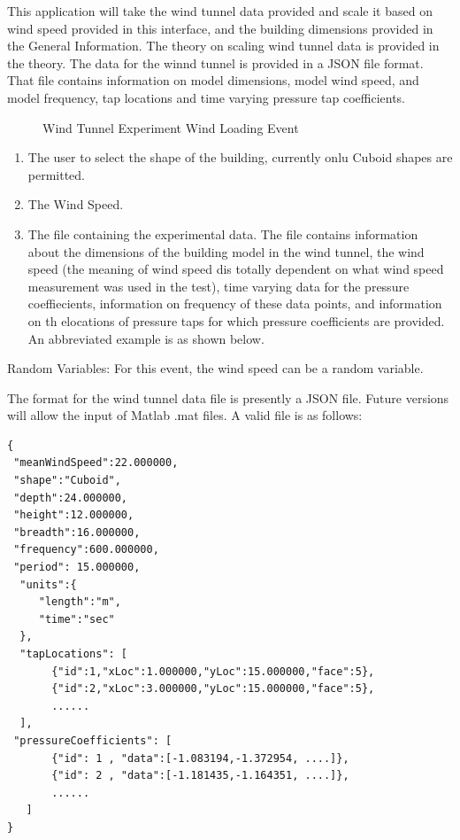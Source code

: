 This application will take the wind tunnel data provided and scale it based on wind speed provided in this interface, and the building dimensions provided in the General Information. The theory on scaling wind tunnel data is provided in the theory. The data for the winnd tunnel is provided in a JSON file format. That file contains information on model dimensions, model wind speed, and model frequency, tap locations and time varying pressure tap coefficients.

\begin{figure}[!htbp]
  \caption{Wind Tunnel Experiment  Wind Loading Event}
  \label{fig:dedm_hrp}
\end{figure}

\begin{enumerate} 
\item The user to select the shape of the building, currently onlu Cuboid shapes are permitted.
\item The Wind Speed.
\item The file containing the experimental data. The file contains information about the dimensions of the building model in the wind tunnel, the wind speed (the meaning of wind speed dis totally dependent on what wind speed measurement was used in the test), time varying data for the pressure coeffiecients, information on frequency of these data points, and information on th elocations of pressure taps for which pressure coefficients are provided. An abbreviated example is as shown below.
\end{enumerate}


Random Variables: For this event, the wind speed can be a random variable.

The format for the wind tunnel data file is presently a JSON file. Future versions will allow the input of Matlab .mat files. A valid file is as follows:

\begin{verbatim}
{
 "meanWindSpeed":22.000000,
 "shape":"Cuboid",
 "depth":24.000000,
 "height":12.000000,
 "breadth":16.000000,
 "frequency":600.000000,
 "period": 15.000000,
  "units":{
     "length":"m",
     "time":"sec"
  },
  "tapLocations": [
       {"id":1,"xLoc":1.000000,"yLoc":15.000000,"face":5},
       {"id":2,"xLoc":3.000000,"yLoc":15.000000,"face":5},
       ......
  ],
 "pressureCoefficients": [
       {"id": 1 , "data":[-1.083194,-1.372954, ....]},
       {"id": 2 , "data":[-1.181435,-1.164351, ....]},
       ......
   ]
}
\end{verbatim}

